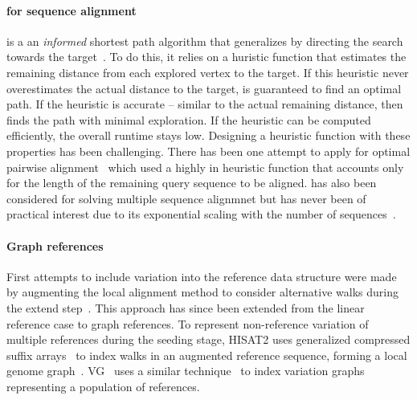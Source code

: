 \paragraph{\A for sequence alignment}
\A is a an \emph{informed} shortest path algorithm that generalizes \dijkstra by
directing the search towards the target~\citep{hart1968formal}. To do this, it
relies on a huristic function that estimates the remaining distance from each
explored vertex to the target. If this heuristic never overestimates the actual
distance to the target, \A is guaranteed to find an optimal path. If the
heuristic is accurate -- similar to the actual remaining distance, then \A finds
the path with minimal exploration. If the heuristic can be computed efficiently,
the overall runtime stays low. Designing a heuristic function with these
properties has been challenging. There has been one attempt to apply \A for
optimal pairwise alignment~\cite{dox2018efficient} which used a highly in
heuristic function that accounts only for the length of the remaining query
sequence to be aligned. \A has also been considered for solving multiple
sequence alignmnet but has never been of practical interest due to its
exponential scaling with the number of
sequences~\citep{lermen2000practical,zhou2002multiple,mcnaughton2002memory}.

\paragraph{Graph references}
First attempts to include variation into the reference data structure were made
by augmenting the local alignment method to consider alternative walks during
the extend step~\cite{schneeberger_simultaneous_2009,palmapper}. This approach
has since been extended from the linear reference case to graph references. To
represent non-reference variation of multiple references during the seeding
stage, HISAT2 uses generalized compressed suffix
arrays~\cite{siren_indexing_2014} to index walks in an augmented reference
sequence, forming a local genome graph~\cite{kim_graphbased_2019}.
VG~\cite{garrison_variation_2018} uses a similar
technique~\cite{siren_indexing_2017} to index variation graphs representing a
population of references.
